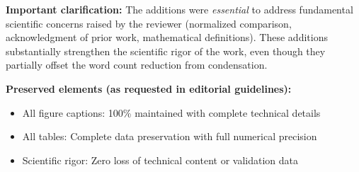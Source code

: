 \documentclass[11pt,a4paper]{article}
\newenvironment{responsebox}{%
    \par\medskip\noindent{\color{responsecolor}\rule{\linewidth}{2pt}}\par
    \noindent{\color{responsecolor}\bfseries Response}\par\smallskip
}{%
    \par\noindent{\color{responsecolor}\rule{\linewidth}{0.5pt}}\medskip
}
\begin{document}
\begin{responsebox}
\textbf{Important clarification:} The additions were \textit{essential} to address fundamental scientific concerns raised by the reviewer (normalized comparison, acknowledgment of prior work, mathematical definitions). These additions substantially strengthen the scientific rigor of the work, even though they partially offset the word count reduction from condensation.

\textbf{Preserved elements (as requested in editorial guidelines):}
\begin{itemize}
    \item All figure captions: 100\% maintained with complete technical details
    \item All tables: Complete data preservation with full numerical precision
    \item Scientific rigor: Zero loss of technical content or validation data
\end{itemize}
\end{responsebox}
\end{document}
